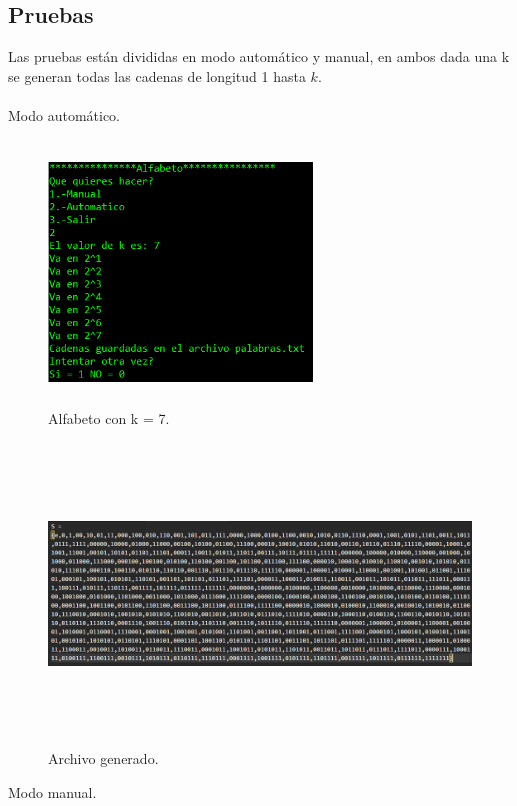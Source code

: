 	\subsection{Pruebas}
	Las pruebas están divididas en modo automático y manual, en ambos dada una k se generan todas las cadenas de longitud 1 hasta $k$.
	\\\\
	{\large Modo automático.}
	\begin{figure}[H]
		\begin{center}
			\includegraphics[width=7cm, height=7cm]{img/automatico-alfabeto.png}
			\caption{Alfabeto con k = 7.}
			\label{fig:alfabeto1}
		\end{center}
	\end{figure}
	\begin{figure}[H]
		\begin{center}
			\includegraphics[width=\linewidth, height=8cm]{img/automatico-alfabeto-salida.png}
			\caption{Archivo generado.}
			\label{fig:alfabeto2}
		\end{center}
	\end{figure}
	{\large Modo manual.}
